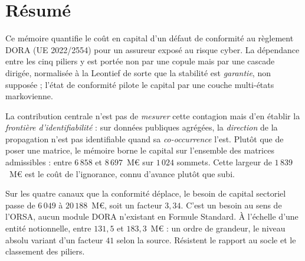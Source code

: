 \chapter*{Résumé}

Ce mémoire quantifie le coût en capital d'un défaut de conformité au règlement DORA
(UE 2022/2554) pour un assureur exposé au risque cyber. La dépendance entre les cinq piliers y
est portée non par une copule mais par une cascade dirigée, normalisée à la Leontief de sorte que
la stabilité est \emph{garantie}, non supposée ; l'état de conformité pilote le capital par une
couche multi-états markovienne.

La contribution centrale n'est pas de \emph{mesurer} cette contagion mais d'en établir la
\emph{frontière d'identifiabilité} : sur données publiques agrégées, la \emph{direction} de la
propagation n'est pas identifiable quand sa \emph{co-occurrence} l'est. Plutôt que de poser une
matrice, le mémoire borne le capital sur l'ensemble des matrices admissibles : entre $6\,858$ et
$8\,697$~M\euro{} sur $1\,024$ sommets. Cette largeur de $1\,839$~M\euro{} est le coût de
l'ignorance, connu d'avance plutôt que subi.

Sur les quatre canaux que la conformité déplace, le besoin de capital sectoriel passe de
$6\,049$ à $20\,188$~M\euro, soit un facteur $3{,}34$. C'est un besoin au sens de l'ORSA, aucun
module DORA n'existant en Formule Standard. À l'échelle d'une entité notionnelle, entre $131{,}5$
et $183{,}3$~M\euro{} : un ordre de grandeur, le niveau absolu variant d'un facteur $41$ selon la
source. Résistent le rapport au socle et le classement des piliers.

